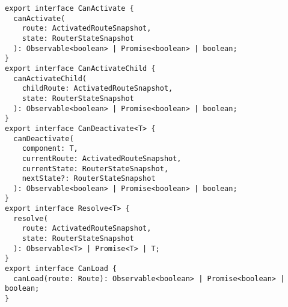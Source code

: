 \begin{verbatim}
export interface CanActivate {
  canActivate(
    route: ActivatedRouteSnapshot,
    state: RouterStateSnapshot
  ): Observable<boolean> | Promise<boolean> | boolean;
}
export interface CanActivateChild {
  canActivateChild(
    childRoute: ActivatedRouteSnapshot,
    state: RouterStateSnapshot
  ): Observable<boolean> | Promise<boolean> | boolean;
}
export interface CanDeactivate<T> {
  canDeactivate(
    component: T,
    currentRoute: ActivatedRouteSnapshot,
    currentState: RouterStateSnapshot,
    nextState?: RouterStateSnapshot
  ): Observable<boolean> | Promise<boolean> | boolean;
}
export interface Resolve<T> {
  resolve(
    route: ActivatedRouteSnapshot,
    state: RouterStateSnapshot
  ): Observable<T> | Promise<T> | T;
}
export interface CanLoad {
  canLoad(route: Route): Observable<boolean> | Promise<boolean> | boolean;
}
\end{verbatim}

